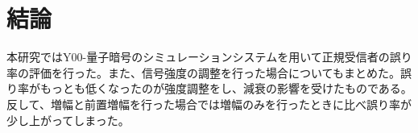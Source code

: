 \chapter{結論}
 本研究ではY00-量子暗号のシミュレーションシステムを用いて正規受信者の誤り率の評価を行った。また、信号強度の調整を行った場合についてもまとめた。誤り率がもっとも低くなったのが強度調整をし、減衰の影響を受けたものである。反して、増幅と前置増幅を行った場合では増幅のみを行ったときに比べ誤り率が少し上がってしまった。